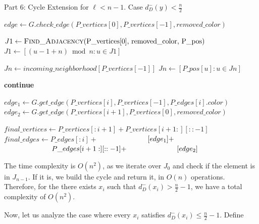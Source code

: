 \begin{algorithm}[H]
    \caption{Part 6: Cycle Extension for \( \ell < n - 1 \). Case \( d^-_D(y) < \frac{n}{2} \)}
    \begin{algorithmic}[1]
            \State $edge \gets G.check\_edge(P\_vertices[0], P\_vertices[-1], removed\_color)$
                \State \Return {}
            \EndIf

            \State $J1 \gets \Call{Find\_Adjacency}{$P\_vertices[0], removed\_color, P\_pos$}$
            \State $J1 \gets [(u - 1 + n) \bmod n : u \in J1]$

            \State $Jn \gets incoming\_neighborhood[P\_vertices[-1]]$
            \State $Jn \gets [P\_pos[u] : u \in Jn]$

                        \State \textbf{continue}
                    \EndIf

                    \State $edge_1 \gets G.get\_edge(P\_vertices[i], P\_vertices[-1], P\_edges[i].color)$
                    \State $edge_2 \gets G.get\_edge(P\_vertices[i+1], P\_vertices[0], removed\_color)$

                    \State $final\_vertices \gets P\_vertices[:i+1] + P\_vertices[i+1:][::-1]$
                    \State $final\_edges \gets P\_edges[:i] +$
                    \State $\hspace{6.7em} [edge_1] +$
                    \State $\hspace{6.7em} P\_edges[i+1:][::-1] +$
                    \State $\hspace{6.7em} [edge_2]$

                    \State \Return {}
                \EndIf
            \EndFor
        \EndFunction
    \end{algorithmic}
\end{algorithm}

The time complexity is $O(n^2)$, as we iterate over $J_0$ and check 
if the element is in $J_{n-1}$. If it is, we build the cycle and return it, in $O(n)$ operations.
Therefore, for the there exists $x_i$ such that $d^-_D(x_i) > \frac{n}{2} - 1$, we have a total 
complexity of $O(n^2)$.

Now, let us analyze the case where every $x_i$ satisfies $d^-_D(x_i) \leq \frac{n}{2} - 1$.
Define

